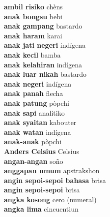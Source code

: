 \textbf{ ambil risiko  } chèns \\
\textbf{ anak bongsu  } bebi \\
\textbf{ anak gampang  } bastardo \\
\textbf{ anak haram  } karai \\
\textbf{ anak jati negeri  } indígena \\
\textbf{ anak kecil  } bamba \\
\textbf{ anak kelahiran  } indígena \\
\textbf{ anak luar nikah  } bastardo \\
\textbf{ anak negeri  } indígena \\
\textbf{ anak panah  } flecha \\
\textbf{ anak patung  } pòpchi \\
\textbf{ anak sapi  } analítiko \\
\textbf{ anak syaitan  } kabouter \\
\textbf{ anak watan  } indígena \\
\textbf{ anak-anak  } pòpchi \\
\textbf{ Anders Celsius  } Celsius \\
\textbf{ angan-angan  } soño \\
\textbf{ anggapan umum  } apstrakshon \\
\textbf{ angin sepoi-sepoi bahasa  } brisa \\
\textbf{ angin sepoi-sepoi  } brisa \\
\textbf{ angka kosong  } cero (numeral) \\
\textbf{ angka lima  } cincuentiun \\
